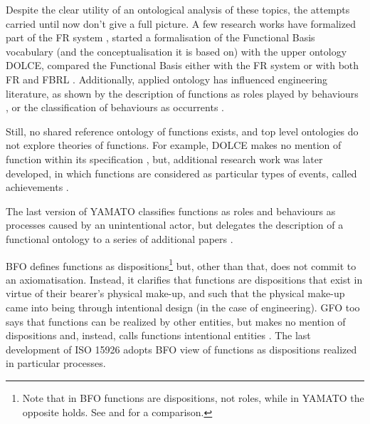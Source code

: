 \documentclass[crcready]{iosart2x}
\newcommand{\DOLCE}{\textsc{DOLCE}\xspace} %
\newcommand{\YAMATO}{\textsc{YAMATO}\xspace}
\newcommand{\BFO}{\textsc{BFO}\xspace}
\newcommand{\GFO}{\textsc{GFO}\xspace}
\begin{document}
Despite the clear utility of an ontological analysis of these topics, the attempts carried until now don't give a full picture. 
A few research works have formalized part of the FR system \cite{borgoFormalOntologicalPerspective2009}, started a formalisation of the Functional Basis 
vocabulary (and the conceptualisation it is based on) with the upper ontology \DOLCE \cite{borgoOntologicalRepresentationFunctional2009, borgoFormalizationFunctionsOperations2011}, compared the Functional Basis either with the FR system \cite{garbaczTwoOntologydrivenFormalisations2011} or with both FR and FBRL \cite{kitamuraDeepSemanticMapping2008}. 
Additionally, applied ontology has influenced engineering literature, as shown by the description of functions as roles played by behaviours \cite{mizoguchiUnifiedDefinitionFunction2012, kitamuraOntologicalModelDevice2006, chandrasekaranFunctionDeviceRepresentation2000}, or the classification of behaviours  as occurrents \cite{kitamuraOntologicalModelDevice2006}.

Still, no shared reference ontology of functions exists, and top level ontologies do not explore theories of functions. 
For example, \DOLCE makes no mention of function within its specification \cite{masoloWonderWebDeliverableD182003}, but, additional research work was later developed, in which 
functions are considered as particular types of events, called achievements \cite{borgoCapabilitiesCapacitiesFunctionalities2021}. 

The last version of \YAMATO classifies functions as roles and behaviours as processes caused by an unintentional actor, 
but delegates the description of a functional ontology to a series of additional papers \cite{kitamuraOntologicalModelDevice2006, kitamuraCharacterizingFunctionsBased2013, mizoguchiFunctionalOntologyArtifacts2009}. 

\BFO defines functions as dispositions\footnote{Note that in \BFO functions are dispositions, not roles, while in \YAMATO the opposite holds. See \cite{mizoguchiFunctionalOntologyArtifacts2009} and\cite{spearFunctionsBasicFormal2016} for a comparison.} 
but, other than that, does not commit to an axiomatisation. 
Instead, it clarifies that functions are dispositions that exist in virtue of their bearer's physical make-up, 
and such that the physical make-up came into being
through intentional design (in the case of engineering). 
\GFO too says that functions can be realized by other entities, but makes no mention of dispositions and, instead, calls functions intentional entities \cite{herreGeneralFormalOntology2006}.
The last development of ISO 15926 \cite{kluwerISO159261420202020} adopts \BFO view of functions as dispositions realized in particular processes.
\end{document}
